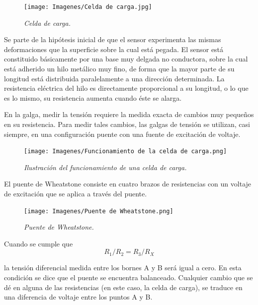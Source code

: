 \documentclass[12pt,A4paper,titlepage]{article}
\begin{document}
\begin{figure}[!h] 
  \centering
  \texttt{[image: Imagenes/Celda de carga.jpg]}
  \caption{\textit{Celda de carga.}}
\end{figure}

\hspace{1mm} Se parte de la hipótesis inicial de que el sensor experimenta las mismas deformaciones que la superficie sobre la cual está pegada. El sensor está constituido básicamente por una base muy delgada no conductora, sobre la cual está adherido un hilo metálico muy fino, de forma que la mayor parte de su longitud está distribuida paralelamente a una dirección determinada. La resistencia eléctrica del hilo es directamente proporcional a su longitud, o lo que es lo mismo, su resistencia aumenta cuando éste se alarga.

\bigskip
\hspace{1mm} En la galga, medir la tensión requiere la medida exacta de cambios muy pequeños en su resistencia. Para medir tales cambios, las galgas de tensión se utilizan, casi siempre, en una configuración puente con una fuente de excitación de voltaje.

\begin{figure}[!h] 
  \centering
  \texttt{[image: Imagenes/Funcionamiento de la celda de carga.png]}
  \caption{\textit{Ilustración del funcionamiento de una celda de carga.}}
\end{figure}

\hspace{1mm} El puente de Wheatstone consiste en cuatro brazos de resistencias con un voltaje de excitación que se aplica a través del puente.

\bigskip
\begin{figure}[!h] 
  \centering
  \texttt{[image: Imagenes/Puente de Wheatstone.png]}
  \caption{\textit{Puente de Wheatstone.}}
\end{figure}

\bigskip

\hspace{1mm} Cuando se cumple que
    \begin{equation}
        R_1/R_2 = R_3/R_X
    \end{equation}

la tensión diferencial medida entre los bornes A y B será igual a cero. En esta condición se dice que el puente se encuentra balanceado. Cualquier cambio que se dé en alguna de las resistencias (en este caso, la celda de carga), se traduce en una diferencia de voltaje entre los puntos A y B.
\bigskip
\end{document}
